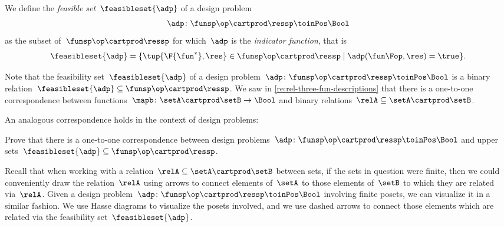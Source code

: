 \begin{definition}
	\label{def:dp-feasible-set}
	We define the \emph{feasible set}~$\feasibleset{\adp}$ of a design problem~
	\begin{equation}
		\label{eq:generic-design-prob}
		\adp\colon \funsp\op \cartprod \ressp \toinPos \Bool
	\end{equation}
	as the subset of~$\funsp \op\cartprod \ressp$ for which~$\adp$ is the \emph{indicator function}, that is%
	\begin{equation}
		\label{eq:design-prob-as-upper-set}
		\feasibleset{\adp} = \{ \tup{\F{\fun^*},\res} \in \funsp \op\cartprod \ressp  \mid %
		\adp(\fun\Fop, \res) = \true %
		\}.
	\end{equation}
\end{definition}

Note that the feasibility set~$\feasibleset{\adp}$ of a design problem~$\adp \colon \funsp \op \cartprod \ressp\toinPos \Bool$ is a binary relation~$\feasibleset{\adp} \subseteq \funsp\op \cartprod \ressp$.
We saw in \cref{re:rel-three-fun-descriptions} that there is a one-to-one correspondence between functions~$\mapb \colon \setA \cartprod \setB \to \Bool$ and binary relations~$\relA \subseteq \setA \cartprod \setB$.

An analogous correspondence holds in the context of design problems:

\begin{exercise}
	\label{ex:adp-uppersets}
	Prove that there is a one-to-one correspondence between design problems~$\adp \colon \funsp \op \cartprod \ressp\toinPos \Bool$ and upper sets~$\feasibleset{\adp} \subseteq \funsp\op \cartprod \ressp$.
\end{exercise}
\begin{solution}
	\missingsolution
\end{solution}

Recall that when working with a relation~$\relA \subseteq \setA \cartprod \setB$ between sets, if the sets in question were finite, then we could conveniently draw the relation~$\relA$ using arrows to connect elements of~$\setA$ to those elements of~$\setB$ to which they are related via~$\relA$.
Given a design problem~$\adp \colon \funsp \op \cartprod \ressp\toinPos \Bool$ involving finite posets, we can visualize it in a similar fashion.
We use Hasse diagrams to visualize the posets involved, and we use dashed arrows to connect those elements which are related via the feasibility set~$\feasibleset{\adp}$.

